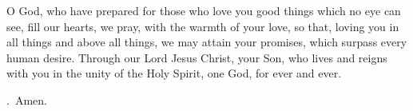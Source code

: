 \lettrine[lines=3]{O}{} God, who have prepared for those who love you 
good things which no eye can see,
fill our hearts, we pray, with the warmth of your love,
so that, loving you in all things and above all things,
we may attain your promises,
which surpass every human desire.
Through our Lord Jesus Christ, your Son,
who lives and reigns with you in the unity of the Holy Spirit,
one God, for ever and ever. \par \Rbar.~Amen.
